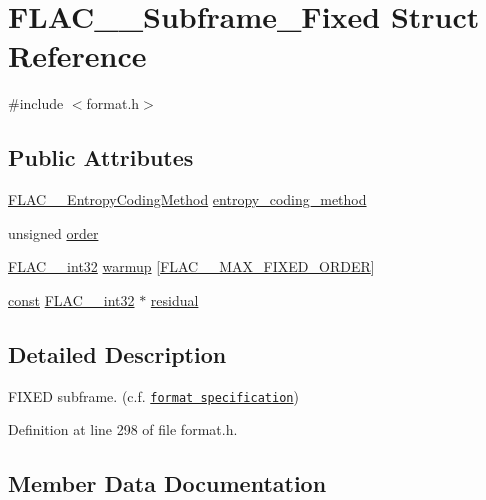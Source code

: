 \hypertarget{struct_f_l_a_c_____subframe___fixed}{}\section{F\+L\+A\+C\+\_\+\+\_\+\+Subframe\+\_\+\+Fixed Struct Reference}
\label{struct_f_l_a_c_____subframe___fixed}


{\ttfamily \#include $<$format.\+h$>$}

\subsection*{Public Attributes}
\begin{DoxyCompactItemize}
\item 
\hyperlink{struct_f_l_a_c_____entropy_coding_method}{F\+L\+A\+C\+\_\+\+\_\+\+Entropy\+Coding\+Method} \hyperlink{struct_f_l_a_c_____subframe___fixed_a0f17f8f756cd2c8acc0262ef14c37088}{entropy\+\_\+coding\+\_\+method}
\item 
unsigned \hyperlink{struct_f_l_a_c_____subframe___fixed_a73f6f3cce3f811c81532729dbad2df0d}{order}
\item 
\hyperlink{ordinals_8h_a33fd77bfe6d685541a0c034a75deccdc}{F\+L\+A\+C\+\_\+\+\_\+int32} \hyperlink{struct_f_l_a_c_____subframe___fixed_a0e9a40fb89b8aa45f83bf8979d200f1f}{warmup} \mbox{[}\hyperlink{group__flac__format_gabd0d5d6fe71b337244712b244ae7cb0f}{F\+L\+A\+C\+\_\+\+\_\+\+M\+A\+X\+\_\+\+F\+I\+X\+E\+D\+\_\+\+O\+R\+D\+ER}\mbox{]}
\item 
\hyperlink{getopt1_8c_a2c212835823e3c54a8ab6d95c652660e}{const} \hyperlink{ordinals_8h_a33fd77bfe6d685541a0c034a75deccdc}{F\+L\+A\+C\+\_\+\+\_\+int32} $\ast$ \hyperlink{struct_f_l_a_c_____subframe___fixed_ab91be48874aec97177106a4086163188}{residual}
\end{DoxyCompactItemize}


\subsection{Detailed Description}
F\+I\+X\+ED subframe. (c.\+f. \href{../format.html#subframe_fixed}{\tt format specification}) 

Definition at line 298 of file format.\+h.



\subsection{Member Data Documentation}

